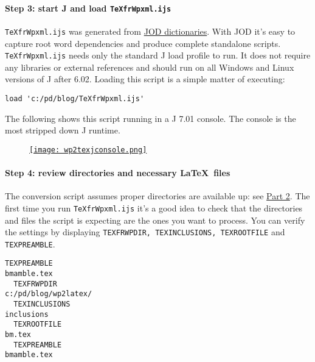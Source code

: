 \paragraph{Step 3: start J and load \texttt{TeXfrWpxml.ijs}}

\texttt{TeXfrWpxml.ijs} was generated from
\href{http://bakerjd99.wordpress.com/the-jod-page/}{JOD dictionaries}.
With JOD it's easy to capture root word dependencies and produce
complete standalone scripts. \texttt{TeXfrWpxml.ijs} needs only the
standard J load profile to run. It does not require any libraries or
external references and should run on all Windows and Linux versions of
J after 6.02. Loading this script is a simple matter of executing:
\begin{tcolorbox}[breakable, size=fbox, boxrule=1pt, pad at break*=1mm,colback=cellbackground, colframe=cellborder]
\begin{verbatim}
load 'c:/pd/blog/TeXfrWpxml.ijs'
\end{verbatim}
\end{tcolorbox}


The following shows this script running in a J 7.01 console. The console
is the most stripped down J runtime.
\begin{figure}[htbp]
\centering
\href{http://bakerjd99.files.wordpress.com/2012/02/wp2texjconsole.png}{\texttt{[image: wp2texjconsole.png]}}
\label{fig:2518X2}
\end{figure}

\paragraph{Step 4: review directories and necessary \LaTeX\ files}

The conversion script assumes proper directories are available up: see
\href{http://bakerjd99.wordpress.com/2012/02/18/wordpress-to-latex-with-pandoc-and-j-latex-directories-part-2-2/}{Part
2}. The first time you run \texttt{TeXfrWpxml.ijs} it's a good idea to
check that the directories and files the script is expecting are the
ones you want to process. You can verify the settings by displaying
\texttt{TEXFRWPDIR, TEXINCLUSIONS, TEXROOTFILE} and
\texttt{TEXPREAMBLE}.

\begin{tcolorbox}[breakable, size=fbox, boxrule=1pt, pad at break*=1mm,colback=cellbackground, colframe=cellborder]
\begin{lstlisting}[language=jdoc,frame=single,framerule=0pt,label=lst:scr2518X0]
  TEXPREAMBLE
bmamble.tex
  TEXFRWPDIR
c:/pd/blog/wp2latex/
  TEXINCLUSIONS
inclusions
  TEXROOTFILE
bm.tex
  TEXPREAMBLE
bmamble.tex
\end{lstlisting}
\end{tcolorbox}

